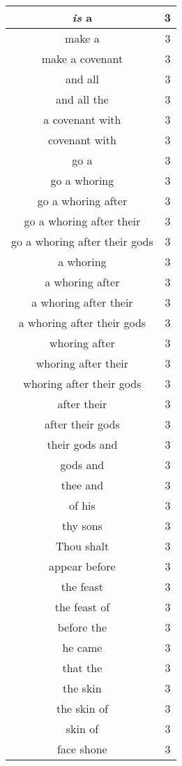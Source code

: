 \begin{center}
\begin{longtable}{|c|c|}
\emph{is} a & 3\\ \hline 
make a & 3\\ \hline 
make a covenant & 3\\ \hline 
and all & 3\\ \hline 
and all the & 3\\ \hline 
a covenant with & 3\\ \hline 
covenant with & 3\\ \hline 
go a & 3\\ \hline 
go a whoring & 3\\ \hline 
go a whoring after & 3\\ \hline 
go a whoring after their & 3\\ \hline 
go a whoring after their gods & 3\\ \hline 
a whoring & 3\\ \hline 
a whoring after & 3\\ \hline 
a whoring after their & 3\\ \hline 
a whoring after their gods & 3\\ \hline 
whoring after & 3\\ \hline 
whoring after their & 3\\ \hline 
whoring after their gods & 3\\ \hline 
after their & 3\\ \hline 
after their gods & 3\\ \hline 
their gods and & 3\\ \hline 
gods and & 3\\ \hline 
thee and & 3\\ \hline 
of his & 3\\ \hline 
thy sons & 3\\ \hline 
Thou shalt & 3\\ \hline 
appear before & 3\\ \hline 
the feast & 3\\ \hline 
the feast of & 3\\ \hline 
before the & 3\\ \hline 
he came & 3\\ \hline 
that the & 3\\ \hline 
the skin & 3\\ \hline 
the skin of & 3\\ \hline 
skin of & 3\\ \hline 
face shone & 3\\ \hline 
\end{longtable}
\end{center}





